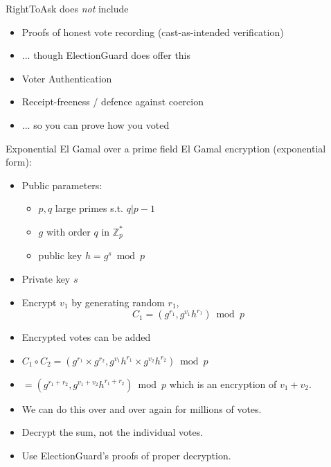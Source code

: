\documentclass[10pt,xcolor=svgnames,169]{beamer} %
\begin{document}
\begin{frame}
	RightToAsk does \emph{not} include
	
\begin{itemize}
	\item Proofs of honest vote recording (cast-as-intended verification)

\item ... though ElectionGuard does offer this
\item Voter Authentication
\item Receipt-freeness / defence against coercion 
\item ... so you can prove how you voted 
\end{itemize}
\end{frame}
	\begin{frame}[fragile]{Exponential El Gamal over a prime field}
	El Gamal encryption (exponential form):
	
	\begin{itemize}
		\item Public parameters: 
			\begin{itemize}
				\item $p,q$ large primes s.t. $q | p-1$ 
				\item $g$ with order $q$ in $\mathbb{Z}^*_p$
				\item public key $h = g^s \bmod p$
			\end{itemize}
		\item Private key $s$
		\item \pause Encrypt $v_1$ by generating random $r_1$,
			 $$C_1 = (g^{r_1}, g^{v_1} h^{r_1})  \bmod p $$
		\item \pause Encrypted votes can be added
		\item \pause $C_1 \circ C_2 = (g^{r_1} \times g^{r_2} , g^{v_1} h^{r_1} \times g^{v_2} h^{r_2} ) \bmod p $ 
		\item \pause $ = (g^{r_1+r_2} , g^{v_1+v_2} h^{r_1+r_2} ) \bmod p $ which is an encryption of $v_1 + v_2$.
		\item \pause We can do this over and over again for millions of votes.
		\item \pause Decrypt the sum, not the individual votes.
		\item \pause Use ElectionGuard's proofs of proper decryption.
	\end{itemize}	
		
	\end{frame}
\end{document}
